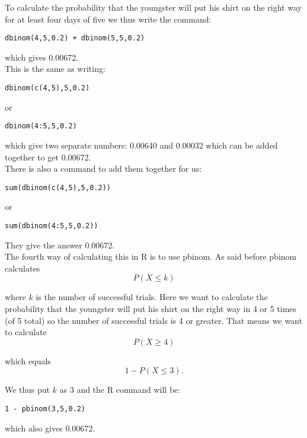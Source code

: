 \documentclass[12pt,a4paper]{article}
\theoremstyle{regla}
\theoremstyle{remark}
\theoremstyle{definition}
\theoremstyle{nonumberbreak}
\begin{document}
\begin{xmpl}
To calculate the probability that the youngster will put his shirt on the right way for at least four days of five we thus write the command:

\begin{lstlisting}
dbinom(4,5,0.2) + dbinom(5,5,0.2)
\end{lstlisting}
which gives 0.00672.\\

This is the same as writing:

\begin{lstlisting}
dbinom(c(4,5),5,0.2)
\end{lstlisting}

or

\begin{lstlisting}
dbinom(4:5,5,0.2)
\end{lstlisting}
which give two separate numbers: 0.00640 and 0.00032 which can be added together to get 0.00672.\\

There is also a command to add them together for us: 

\begin{lstlisting}
sum(dbinom(c(4,5),5,0.2))
\end{lstlisting}

or

\begin{lstlisting}
sum(dbinom(4:5,5,0.2))
\end{lstlisting}

They give the answer 0.00672.\\

The fourth way of calculating this in R is to use pbinom. As said before pbinom calculates $$P(X \leq k)$$

where $k$ is the number of successful trials. Here we want to calculate the probability that the youngster will put his shirt on the right way in 4 or 5 times (of 5 total) so the number of successful trials is 4 or greater. That means we want to calculate $$P(X \geq 4)$$

which equals $$1 - P(X \leq 3).$$

We thus put $k$ as 3 and the R command will be:

\begin{lstlisting}
1 - pbinom(3,5,0.2)
\end{lstlisting}

which also gives 0.00672.

\end{xmpl} 
\end{document}
